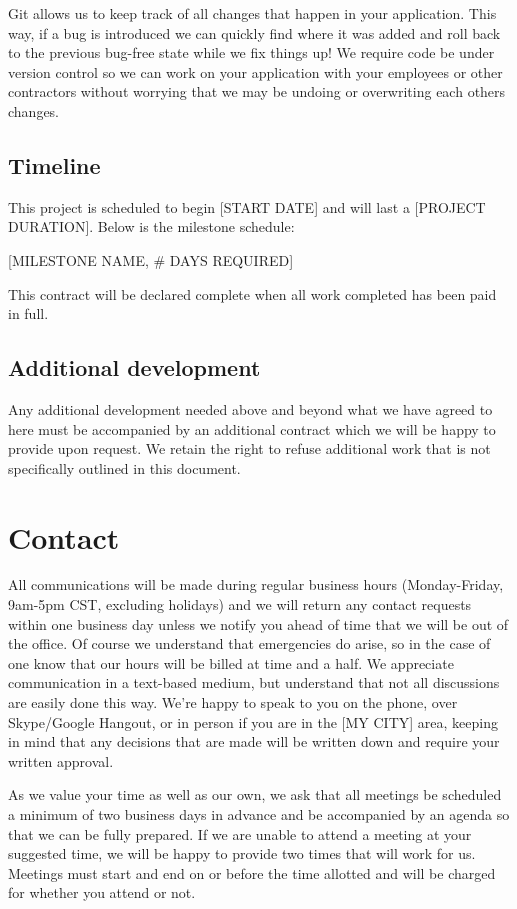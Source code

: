 \documentclass[10pt,a4paper,parskip]{scrartcl}
\begin{document}
Git allows us to keep track of all changes that happen in your application.
This way, if a bug is introduced we can quickly find where it was added and
roll back to the previous bug-free state while we fix things up! We require
code be under version control so we can work on your application with your
employees or other contractors without worrying that we may be undoing or
overwriting each others changes.

\subsection{Timeline}

This project is scheduled to begin [START DATE] and will last a [PROJECT DURATION].
Below is the milestone schedule:

[MILESTONE NAME, \# DAYS REQUIRED]

This contract will be declared complete when all work completed has been paid in full.

\subsection{Additional development}

Any additional development needed above and beyond what we have agreed to here
must be accompanied by an additional contract which we will be happy to provide
upon request. We retain the right to refuse additional work that is not
specifically outlined in this document.

\section{Contact}

All communications will be made during regular business hours (Monday-Friday,
9am-5pm CST, excluding holidays) and we will return any contact requests within
one business day unless we notify you ahead of time that we will be out of the
office. Of course we understand that emergencies do arise, so in the case of
one know that our hours will be billed at time and a half. We appreciate
communication in a text-based medium, but understand that not all discussions
are easily done this way. We’re happy to speak to you on the phone, over
Skype/Google Hangout, or in person if you are in the [MY CITY] area, keeping in
mind that any decisions that are made will be written down and require your
written approval.

As we value your time as well as our own, we ask that all meetings be scheduled
a minimum of two business days in advance and be accompanied by an agenda so
that we can be fully prepared. If we are unable to attend a meeting at your
suggested time, we will be happy to provide two times that will work for us.
Meetings must start and end on or before the time allotted and will be charged
for whether you attend or not.
\end{document}
